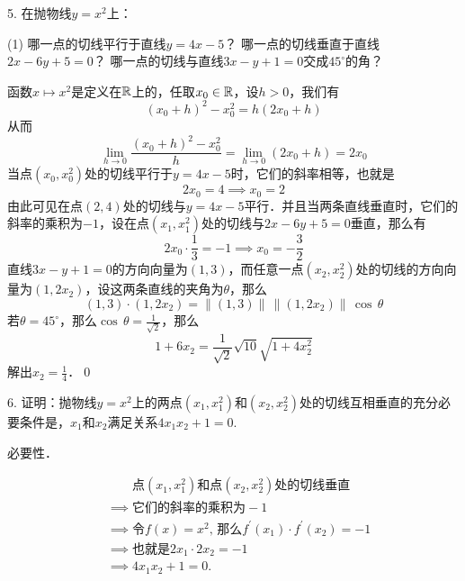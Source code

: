 5. 在抛物线$y=x^2$上：
\begin{tasks}(1)
    \task 哪一点的切线平行于直线$y=4x-5$？ 
    \task 哪一点的切线垂直于直线$2x-6y+5=0$？ 
    \task 哪一点的切线与直线$3x-y+1=0$交成$45^{\circ}$的角？
\end{tasks}

\solve 函数$x \mapsto x^2$是定义在$\mathbb{R}$上的，任取$x_0 \in \mathbb{R}$，设$h > 0$，我们有
\begin{equation}
    (x_0 + h)^2 - x_0^2 = h(2x_0 + h)
\end{equation}
从而
\begin{equation}
    \lim_{h \to 0} \frac{\left(x_0+h\right)^2-x_0^2}{h} = \lim_{h \to 0} \left( 2x_0 + h\right) = 2x_0
\end{equation}
当点$(x_0, x_0^2)$处的切线平行于$y=4x-5$时，它们的斜率相等，也就是
\begin{equation}
    2x_0 = 4 \implies x_0 = 2
\end{equation}
由此可见在点$(2, 4)$处的切线与$y=4x-5$平行．并且当两条直线垂直时，它们的斜率的乘积为$-1$，设在点$(x_1, x_1^2)$处的切线与$2x-6y+5=0$垂直，那么有
\begin{equation}
    2x_0 \cdot \frac{1}{3} = -1 \implies x_0 = -\frac{3}{2}
\end{equation}
直线$3x-y+1=0$的方向向量为$(1, 3)$，而任意一点$(x_2, x_2^2)$处的切线的方向向量为$(1, 2x_2)$，设这两条直线的夹角为$\theta$，那么
\begin{equation}
    (1, 3) \cdot (1, 2x_2) = \lVert (1, 3) \rVert \, \lVert (1, 2x_2) \rVert \, \cos \, \theta 
\end{equation}
若$\theta = 45^\circ$，那么$\cos \, \theta = \displaystyle\frac{1}{\sqrt{2}}$，那么
\begin{equation}
    1 + 6 x_2 = \frac{1}{\sqrt{2}} \sqrt{10} \sqrt{1 + 4x_2^2}
\end{equation}
解出$x_2 = \displaystyle\frac{1}{4}$．\qed\bigskip

6. 证明：抛物线$y=x^2$上的两点$(x_1,x_1^2)$和$(x_2,x_2^2)$处的切线互相垂直的充分必要条件是，$x_1$和$x_2$满足关系$4x_1 x_2 + 1 = 0$.

\prove 

必要性．

\begin{align}
    &\mathrel{\phantom{\implies}} \text{点}(x_1,x_1^2)\text{和点}(x_2,x_2^2)\text{处的切线垂直} \\
    &\implies \text{它们的斜率的乘积为} -1 \\
    &\implies \text{令}f(x)=x^2, \, \text{那么} f^{\prime}(x_1) \cdot f^{\prime} (x_2) = -1 \\
    &\implies \text{也就是} 2x_1 \cdot 2x_2 = -1 \\
    &\implies 4x_1 x_2 + 1 = 0.
\end{align}


